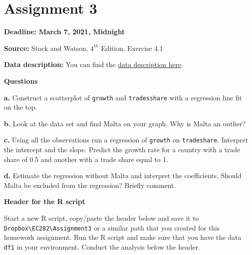 \documentclass[
]{book}
\begin{document}
\hypertarget{assignment-3}{%
\section{Assignment 3}\label{assignment-3}}

\textbf{Deadline: March 7, 2021, Midnight}

\textbf{Source:} Stock and Watson, \(4^{th}\) Edition, Exercise 4.1

\textbf{Data description:} You can find the \href{https://www.dropbox.com/s/3e24u6eymvmhldd/Growth_Description.pdf?dl=1}{data description here}.

\textbf{Questions}

\textbf{a.} Construct a scatterplot of \texttt{growth} and \texttt{tradesshare} with a regression line fit on the top.

\textbf{b.} Look at the data set and find Malta on your graph. Why is Malta an outlier?

\textbf{c.} Using all the observations run a regression of \texttt{growth} on \texttt{tradeshare}. Interpret the intercept and the slope. Predict the growth rate for a country with a trade share of 0.5 and another with a trade share equal to 1.

\textbf{d.} Estimate the regression without Malta and interpret the coefficients. Should Malta be excluded from the regression? Briefly comment.

\textbf{Header for the R script}

Start a new R script, copy/paste the header below and save it to \texttt{Dropbox\textbackslash{}EC282\textbackslash{}Assignment3} or a similar path that you created for this homework assignment. Run the R script and make sure that you have the data \texttt{df1} in your environment. Conduct the analysis below the header.
\end{document}
